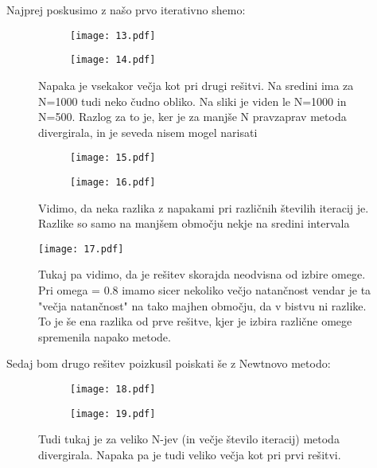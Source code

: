 \documentclass{article}
\begin{document}
Najprej poskusimo z našo prvo iterativno shemo:

\begin{figure}[H]
\begin{subfigure}{.5\textwidth}
\texttt{[image: 13.pdf]}
\end{subfigure}
\begin{subfigure}{.5\textwidth}
\texttt{[image: 14.pdf]}
\end{subfigure}
\caption*{Napaka je vsekakor večja kot pri drugi rešitvi. Na sredini ima za N=1000 tudi neko čudno obliko. Na sliki je viden le N=1000 in N=500. Razlog za to je, ker je za manjše N pravzaprav metoda divergirala, in je seveda nisem mogel narisati}
\end{figure}

\begin{figure}[H]
\begin{subfigure}{.5\textwidth}
\texttt{[image: 15.pdf]}
\end{subfigure}
\begin{subfigure}{.5\textwidth}
\texttt{[image: 16.pdf]}
\end{subfigure}
\caption*{Vidimo, da neka razlika z napakami pri različnih številih iteracij je. Razlike so samo na manjšem območju nekje na sredini intervala} 
\end{figure}

\begin{figure}[H]
\texttt{[image: 17.pdf]}
\caption*{Tukaj pa vidimo, da je rešitev skorajda neodvisna od izbire omege. Pri omega = 0.8 imamo sicer nekoliko večjo natančnost vendar je ta "večja natančnost" na tako majhen območju, da v  bistvu ni razlike. To je še ena razlika od prve rešitve, kjer je izbira različne omege spremenila napako metode.}
\end{figure}

Sedaj bom drugo rešitev poizkusil poiskati še z Newtnovo metodo:

\begin{figure}[H]
\begin{subfigure}{.5\textwidth}
\texttt{[image: 18.pdf]}
\end{subfigure}
\begin{subfigure}{.5\textwidth}
\texttt{[image: 19.pdf]}
\end{subfigure}
\caption*{Tudi tukaj je za veliko N-jev (in večje število iteracij) metoda divergirala. Napaka pa je tudi veliko večja kot pri prvi rešitvi.} 
\end{figure}
\end{document}
